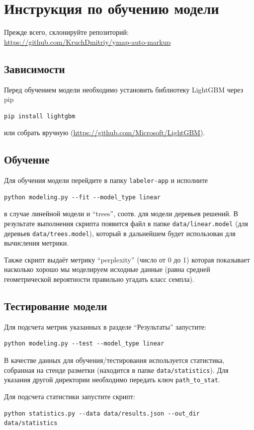 \documentclass[12pt]{article}
\begin{document}
\section{Инструкция по обучению модели}
\label{model-fit}
Прежде всего, склонируйте репозиторий:\\
\url{https://github.com/KruchDmitriy/ymap-auto-markup}

\subsection{Зависимости}
Перед обучением модели необходимо установить библиотеку LightGBM через pip
\begin{verbatim}
pip install lightgbm
\end{verbatim}
или собрать вручную (\url{https://github.com/Microsoft/LightGBM}).

\subsection{Обучение}
Для обучения модели перейдите в папку \texttt{labeler-app} и исполните
\begin{verbatim}
python modeling.py --fit --model_type linear
\end{verbatim}
в случае линейной модели и ``trees'', соотв. для модели деревьев решений.
В результате выполнения скрипта появится файл в папке \texttt{data/linear.model}
(для деревьев \texttt{data/trees.model}),
который в дальнейшем будет использован для вычисления метрики.

Также скрипт выдаёт метрику ``perplexity'' (число от 0 до 1) которая показывает насколько хорошо мы моделируем исходные данные (равна средней геометрической вероятности правильно угадать класс семпла).

\subsection{Тестирование модели}
Для подсчета метрик указанных в разделе ``Результаты'' запустите:
\begin{verbatim}
python modeling.py --test --model_type linear
\end{verbatim}

В качестве данных для обучения/тестирования используется статистика, собранная на стенде разметки (находится в папке \texttt{data/statistics}). Для указания другой директории необходимо передать ключ \texttt{\-\-path\_to\_stat}.

Для подсчета статистики запустите скрипт:
{\small
\begin{verbatim}
python statistics.py --data data/results.json --out_dir data/statistics
\end{verbatim}
}
\end{document}
